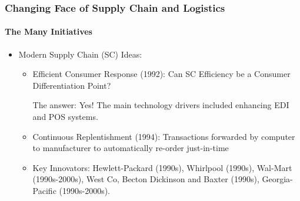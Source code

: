 \begin{frame}
  \frametitle{Changing Face of Supply Chain and Logistics}
  \framesubtitle{The Many Initiatives}
  \begin{itemize}
    \item<1-> Modern Supply Chain (SC) Ideas:
          \begin{itemize}

            \item <2-> Efficient Consumer Response (1992): Can SC Efficiency be a Consumer Differentiation Point?

                  The answer: Yes! The main technology drivers included enhancing EDI and POS systems.

            \item <3-> Continuous Replentishment (1994): Transactions forwarded by computer to manufacturer to automatically re-order just-in-time


            \item <4-> Key Innovators: Hewlett-Packard (1990s), Whirlpool (1990s), Wal-Mart (1990s-2000s), West Co, Becton Dickinson and Baxter (1990s), Georgia-Pacific (1990s-2000s).
          \end{itemize}






  \end{itemize}
\end{frame}
